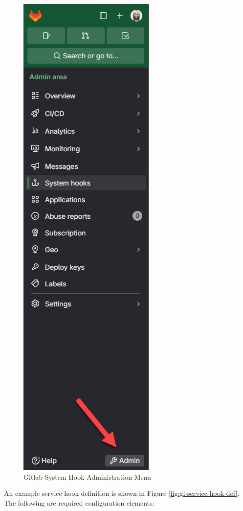 \begin{figure}[ht]
  \centering
  \includegraphics[scale=.5]{graphics/gl-system-hook-admin.png}
  \caption{Gitlab System Hook Administration Menu}
  \label{fig:gl-admin-menu}
\end{figure}


An example service hook definition is shown in Figure \ref{fig:gl-service-hook-def}.  The following are
required configuration elements:

